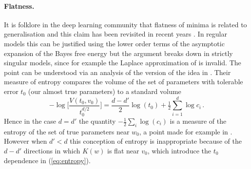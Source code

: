 \documentclass[11pt]{article}
\numberwithin{equation}{section}
\theoremstyle{plain}
\theoremstyle{definition}
\begin{document}
\paragraph{Flatness.} It is folklore in the deep learning community that flatness of minima is related to generalisation \citep{hinton_keeping_1993, hochreiter1997flat} and this claim has been revisited in recent years \citep{chaudhari2019entropy, smith2017bayesian, jastrzkebski2017three, zhang_energyentropy_2018}. In regular models this can be justified using the lower order terms of the asymptotic expansion of the Bayes free energy \citep[\S 3.1]{Balasubramanian:1996cond.mat..1030B} but the argument breaks down in strictly singular models, since for example the Laplace approximation of \citet{zhang_energyentropy_2018} is invalid. The point can be understood via an analysis of the version of the idea in \citep{hochreiter1997flat}. Their measure of entropy compares the volume of the set of parameters with tolerable error $t_0$ (our almost true parameters) to a standard volume
\begin{equation}\label{eq:entropy}
	- \log\Big[\frac{V(t_0,v_0)}{t_0^{d/2}}\Big] = \frac{d-d'}{2} \log(t_0) + \tfrac{1}{2} \sum_{i=1}^{d} \log c_i\,.
\end{equation}
Hence in the case $d = d'$ the quantity $-\tfrac{1}{2} \sum_i \log(c_i)$ is a measure of the entropy of the set of true parameters near $w_0$, a point made for example in \citet{zhang_energyentropy_2018}. However when $d' < d$ this conception of entropy is inappropriate because of the $d - d'$ directions in which $K(w)$ is flat near $v_0$, which introduce the $t_0$ dependence in (\ref{eq:entropy}). %

\end{document}
